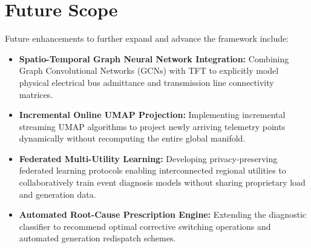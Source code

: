 \documentclass[12pt,a4paper]{report}
\begin{document}
\section{Future Scope}
Future enhancements to further expand and advance the framework include:
\begin{itemize}
    \item \textbf{Spatio-Temporal Graph Neural Network Integration:} Combining Graph Convolutional Networks (GCNs) with TFT to explicitly model physical electrical bus admittance and transmission line connectivity matrices.
    \item \textbf{Incremental Online UMAP Projection:} Implementing incremental streaming UMAP algorithms to project newly arriving telemetry points dynamically without recomputing the entire global manifold.
    \item \textbf{Federated Multi-Utility Learning:} Developing privacy-preserving federated learning protocols enabling interconnected regional utilities to collaboratively train event diagnosis models without sharing proprietary load and generation data.
    \item \textbf{Automated Root-Cause Prescription Engine:} Extending the diagnostic classifier to recommend optimal corrective switching operations and automated generation redispatch schemes.
\end{itemize}
\end{document}
